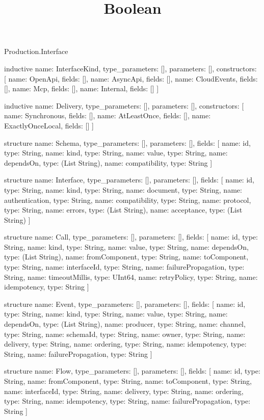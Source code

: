 \begin{lexlean}{Production.Interface}
\title{Boolean}
\begin{semanticmodule}
inductive{
  name: InterfaceKind,
  type_parameters: [],
  parameters: [],
  constructors: [
    {name: OpenApi, fields: []},
    {name: AsyncApi, fields: []},
    {name: CloudEvents, fields: []},
    {name: Mcp, fields: []},
    {name: Internal, fields: []}
  ]
}

inductive{
  name: Delivery,
  type_parameters: [],
  parameters: [],
  constructors: [
    {name: Synchronous, fields: []},
    {name: AtLeastOnce, fields: []},
    {name: ExactlyOnceLocal, fields: []}
  ]
}

structure{
  name: Schema,
  type_parameters: [],
  parameters: [],
  fields: [
    {name: id, type: String},
    {name: kind, type: String},
    {name: value, type: String},
    {name: dependsOn, type: (List String)},
    {name: compatibility, type: String}
  ]
}

structure{
  name: Interface,
  type_parameters: [],
  parameters: [],
  fields: [
    {name: id, type: String},
    {name: kind, type: String},
    {name: document, type: String},
    {name: authentication, type: String},
    {name: compatibility, type: String},
    {name: protocol, type: String},
    {name: errors, type: (List String)},
    {name: acceptance, type: (List String)}
  ]
}

structure{
  name: Call,
  type_parameters: [],
  parameters: [],
  fields: [
    {name: id, type: String},
    {name: kind, type: String},
    {name: value, type: String},
    {name: dependsOn, type: (List String)},
    {name: fromComponent, type: String},
    {name: toComponent, type: String},
    {name: interfaceId, type: String},
    {name: failurePropagation, type: String},
    {name: timeoutMillis, type: UInt64},
    {name: retryPolicy, type: String},
    {name: idempotency, type: String}
  ]
}

structure{
  name: Event,
  type_parameters: [],
  parameters: [],
  fields: [
    {name: id, type: String},
    {name: kind, type: String},
    {name: value, type: String},
    {name: dependsOn, type: (List String)},
    {name: producer, type: String},
    {name: channel, type: String},
    {name: schemaId, type: String},
    {name: owner, type: String},
    {name: delivery, type: String},
    {name: ordering, type: String},
    {name: idempotency, type: String},
    {name: failurePropagation, type: String}
  ]
}

structure{
  name: Flow,
  type_parameters: [],
  parameters: [],
  fields: [
    {name: id, type: String},
    {name: fromComponent, type: String},
    {name: toComponent, type: String},
    {name: interfaceId, type: String},
    {name: delivery, type: String},
    {name: ordering, type: String},
    {name: idempotency, type: String},
    {name: failurePropagation, type: String}
  ]
}
\end{semanticmodule}
\end{lexlean}

